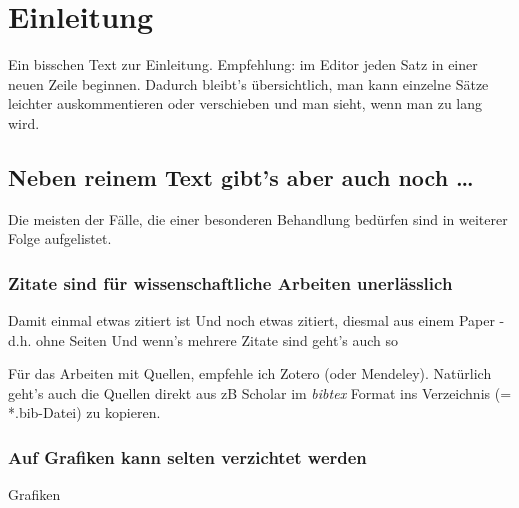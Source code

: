 \section{Einleitung}
Ein bisschen Text zur Einleitung.
Empfehlung: im Editor jeden Satz in einer neuen Zeile beginnen.
Dadurch bleibt's übersichtlich, man kann einzelne Sätze leichter auskommentieren oder verschieben und man sieht, wenn man zu lang wird.

\subsection{Neben reinem Text gibt's aber auch noch \ldots }
Die meisten der Fälle, die einer besonderen Behandlung bedürfen sind in weiterer Folge aufgelistet.

\subsubsection{Zitate sind für wissenschaftliche Arbeiten unerlässlich}
Damit einmal etwas zitiert ist \cite[S. 127ff.]{knuth1997}
Und noch etwas zitiert, diesmal aus einem Paper - d.h. ohne Seiten \cite{mcintosh1995}
Und wenn's mehrere Zitate sind geht's auch so \cite{mcintosh1995,knuth1997}

Für das Arbeiten mit Quellen, empfehle ich Zotero (oder Mendeley).
Natürlich geht's auch die Quellen direkt aus zB Scholar im \textit{bibtex} Format ins Verzeichnis (= *.bib-Datei) zu kopieren.

\cite{mcintosh1995,knuth1997, granville1992}

\subsubsection{Auf Grafiken kann selten verzichtet werden}
Grafiken

